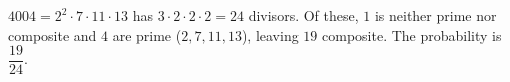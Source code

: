 $4004=2^2\cdot7\cdot11\cdot13$ has $3\cdot2\cdot2\cdot2=24$ divisors. Of these, $1$ is neither prime nor composite and $4$ are prime ($2,7,11,13$), leaving $19$ composite. The probability is $\boxed{\dfrac{19}{24}}$.
